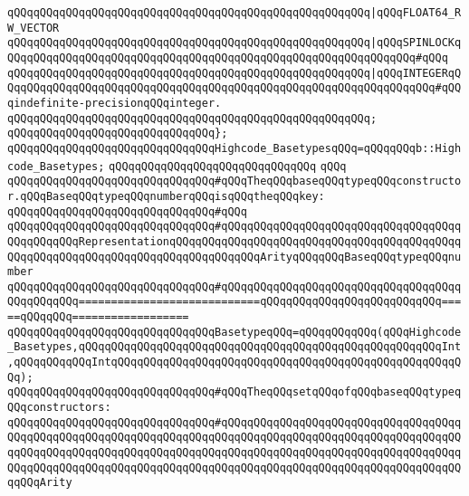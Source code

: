 \verb|qQQqqQQqqQQqqQQqqQQqqQQqqQQqqQQqqQQqqQQqqQQqqQQqqQQqqQQq|\verb#|qQQqFLOAT64_RW_VECTOR#\newline
\verb|qQQqqQQqqQQqqQQqqQQqqQQqqQQqqQQqqQQqqQQqqQQqqQQqqQQqqQQq|\verb#|qQQqSPINLOCKqQQqqQQqqQQqqQQqqQQqqQQqqQQqqQQqqQQqqQQqqQQqqQQqqQQqqQQqqQQqqQQq#\verb|#qQQq|\newline
\newline
\verb|qQQqqQQqqQQqqQQqqQQqqQQqqQQqqQQqqQQqqQQqqQQqqQQqqQQqqQQq|\verb#|qQQqINTEGERqQQqqQQqqQQqqQQqqQQqqQQqqQQqqQQqqQQqqQQqqQQqqQQqqQQqqQQqqQQqqQQqqQQq#\verb|#qQQqindefinite-precisionqQQqinteger.|\newline
\verb|qQQqqQQqqQQqqQQqqQQqqQQqqQQqqQQqqQQqqQQqqQQqqQQqqQQqqQQq;|\newline
\verb|qQQqqQQqqQQqqQQqqQQqqQQqqQQqqQQq};|\newline
\verb|qQQqqQQqqQQqqQQqqQQqqQQqqQQqqQQqHighcode_BasetypesqQQq=qQQqqQQqb::Highcode_Basetypes;|\newline
\verb|qQQqqQQqqQQqqQQqqQQqqQQqqQQqqQQq|\newline
\verb|qQQq|\newline
\verb|qQQqqQQqqQQqqQQqqQQqqQQqqQQqqQQq#qQQqTheqQQqbaseqQQqtypeqQQqconstructor.qQQqBaseqQQqtypeqQQqnumberqQQqisqQQqtheqQQqkey:|\newline
\verb|qQQqqQQqqQQqqQQqqQQqqQQqqQQqqQQq#qQQq|\newline
\verb|qQQqqQQqqQQqqQQqqQQqqQQqqQQqqQQq#qQQqqQQqqQQqqQQqqQQqqQQqqQQqqQQqqQQqqQQqqQQqqQQqRepresentationqQQqqQQqqQQqqQQqqQQqqQQqqQQqqQQqqQQqqQQqqQQqqQQqqQQqqQQqqQQqqQQqqQQqqQQqqQQqqQQqqQQqArityqQQqqQQqBaseqQQqtypeqQQqnumber|\newline
\verb|qQQqqQQqqQQqqQQqqQQqqQQqqQQqqQQq#qQQqqQQqqQQqqQQqqQQqqQQqqQQqqQQqqQQqqQQqqQQqqQQq============================qQQqqQQqqQQqqQQqqQQqqQQqqQQq=====qQQqqQQq==================|\newline
\verb|qQQqqQQqqQQqqQQqqQQqqQQqqQQqqQQqBasetypeqQQq=qQQqqQQqqQQq(qQQqHighcode_Basetypes,qQQqqQQqqQQqqQQqqQQqqQQqqQQqqQQqqQQqqQQqqQQqqQQqqQQqqQQqInt,qQQqqQQqqQQqIntqQQqqQQqqQQqqQQqqQQqqQQqqQQqqQQqqQQqqQQqqQQqqQQqqQQqqQQq);|\newline
\newline
\verb|qQQqqQQqqQQqqQQqqQQqqQQqqQQqqQQq#qQQqTheqQQqsetqQQqofqQQqbaseqQQqtypeqQQqconstructors:|\newline
\verb|qQQqqQQqqQQqqQQqqQQqqQQqqQQqqQQq#qQQqqQQqqQQqqQQqqQQqqQQqqQQqqQQqqQQqqQQqqQQqqQQqqQQqqQQqqQQqqQQqqQQqqQQqqQQqqQQqqQQqqQQqqQQqqQQqqQQqqQQqqQQqqQQqqQQqqQQqqQQqqQQqqQQqqQQqqQQqqQQqqQQqqQQqqQQqqQQqqQQqqQQqqQQqqQQqqQQqqQQqqQQqqQQqqQQqqQQqqQQqqQQqqQQqqQQqqQQqqQQqqQQqqQQqqQQqqQQqqQQqqQQqqQQqArity|\newline
